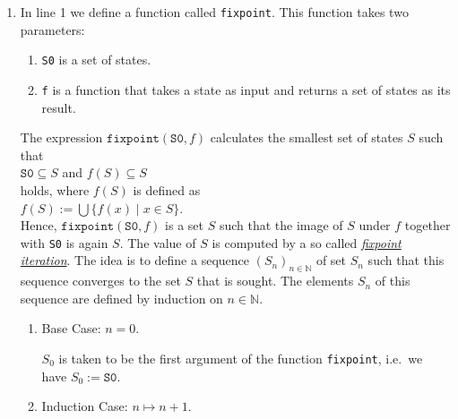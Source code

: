 \begin{enumerate}
\item In line 1 we define a function called \texttt{fixpoint}.  This function takes two parameters:
      \begin{enumerate}
      \item \texttt{S0} is a set of states.
      \item \texttt{f}  is a function that takes a state as input and returns a set
            of states as its result.
      \end{enumerate}
      The expression $\texttt{fixpoint}(\mathtt{S0},f)$ calculates the smallest set of states $S$ such that
      \\[0.2cm]
      \hspace*{1.3cm}
      $\mathtt{S0} \subseteq S$ \quad and \quad $f(S) \subseteq S$ 
      \\[0.2cm]
      holds, where $f(S)$ is defined as
      \\[0.2cm]
      \hspace*{1.3cm}
       $f(S) := \bigcup\{ f(x) \mid x \in S \}$.
       \\[0.2cm]
      Hence, $\texttt{fixpoint}(\mathtt{S0},f)$ is a set $S$ such that the image of $S$ under $f$
      together with \texttt{S0} is again $S$.  The value of $S$ is computed by a so called 
      \href{http://en.wikipedia.org/wiki/Fixed-point_iteration}{\emph{fixpoint iteration}}.
      The idea is to define a sequence $(S_n)_{n \in \mathbb{N}}$ of set $S_n$ such that this
      sequence converges to the set $S$ that is sought.  The elements $S_n$ of this sequence are
      defined by induction on $n \in \mathbb{N}$.

      \begin{enumerate}
      \item Base Case: $n=0$.
        
                   $S_0$ is taken to be the first argument of the function \texttt{fixpoint},
                   i.e.~we have $S_0 := \texttt{S0}$.
      \item Induction Case: $n \mapsto n+1$.


\end{enumerate}
\end{enumerate}
